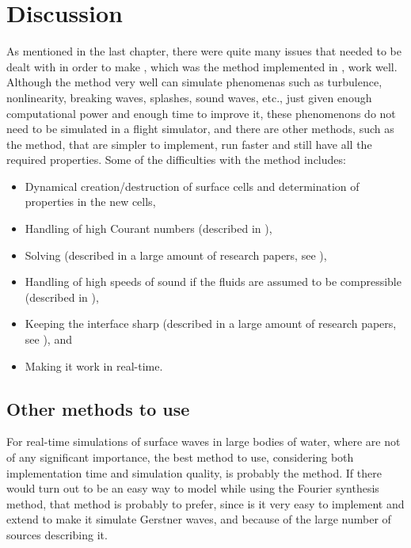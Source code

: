 \chapter{Discussion}

As mentioned in the last chapter, there were quite many issues that needed to be dealt with in order to make \thismethod, which was the method implemented in \thisprojectwork, work well. Although the method very well can simulate phenomenas such as turbulence, nonlinearity, breaking waves, splashes, sound waves, etc., just given enough computational power and enough time to improve it, these phenomenons do not need to be simulated in a flight simulator, and there are other methods, such as the \LPD method, that are simpler to implement, run faster and still have all the required properties. Some of the difficulties with the method includes:

\begin{itemize}
    \item Dynamical creation/destruction of surface cells and determination of properties in the new cells,
    \item Handling of high Courant numbers (described in \citep{Stam1999}),
    \item Solving  (described in a large amount of research papers, see ),
    \item Handling of high speeds of sound if the fluids are assumed to be compressible (described in \citep{Kwatra2009}),
    \item Keeping the interface sharp (described in a large amount of research papers, see ), and
    \item Making it work in real-time.
\end{itemize}

\section{Other methods to use}

For real-time simulations of surface waves in large bodies of water, where  are not of any significant importance, the best method to use, considering both implementation time and simulation quality, is probably the \LPD method. If there would turn out to be an easy way to model \FSI while using the Fourier synthesis method, that method is probably to prefer, since is it very easy to implement and extend to make it simulate Gerstner waves, and because of the large number of sources describing it.

